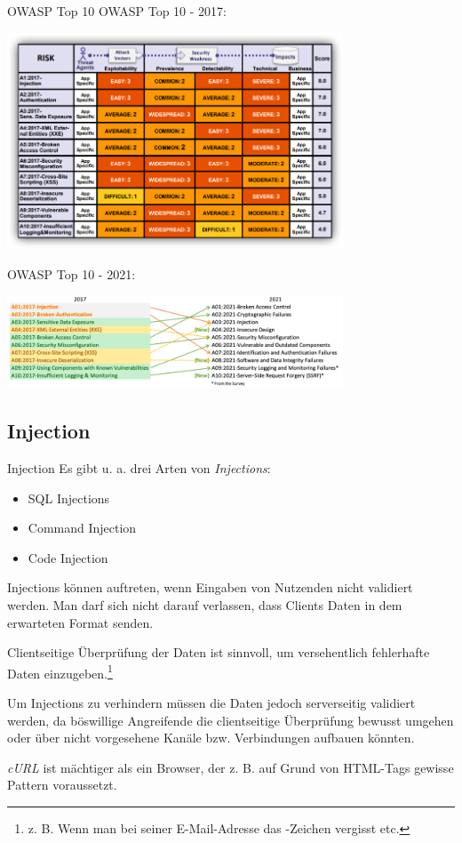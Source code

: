 \begin{bonus}{OWASP Top 10}
    OWASP Top 10 - 2017:
    \begin{center}
        \includegraphics[width=0.75\textwidth]{includes/figures/bonus_owasp_top10_2017.png}
    \end{center}

    OWASP Top 10 - 2021:
    \begin{center}
        \includegraphics[width=0.75\textwidth]{includes/figures/bonus_owasp_top10_2021.png}
    \end{center}
\end{bonus}

\subsection{Injection}

\begin{defi}{Injection}
    Es gibt u. a. drei Arten von \emph{Injections}:
    \begin{itemize}
        \item SQL Injections
        \item Command Injection
        \item Code Injection
    \end{itemize}

    Injections können auftreten, wenn Eingaben von Nutzenden nicht validiert werden.
    Man darf sich nicht darauf verlassen, dass Clients Daten in dem erwarteten Format senden.

    Clientseitige Überprüfung der Daten ist sinnvoll, um versehentlich fehlerhafte Daten einzugeben.\footnote{z. B. Wenn man bei seiner E-Mail-Adresse das \texttt{\@}-Zeichen vergisst etc.}

    Um Injections zu verhindern müssen die Daten jedoch serverseitig validiert werden, da böswillige Angreifende die clientseitige Überprüfung bewusst umgehen oder über nicht vorgesehene Kanäle bzw. Verbindungen aufbauen könnten.

    \emph{cURL} ist mächtiger als ein Browser, der z. B. auf Grund von HTML-Tags gewisse Pattern voraussetzt.
\end{defi}

